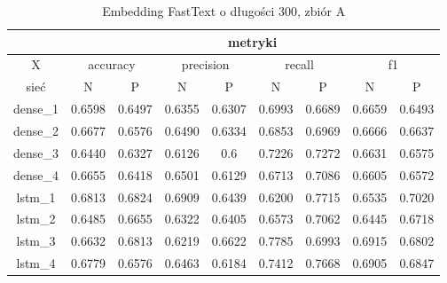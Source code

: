 \begin{table}[p] \label{tab:wyniki_fastext_A} \centering
    \caption{Embedding FastText o długości 300, zbiór A}
    \begin{tabular}{|c|c|c|c|c|c|c|c|c|}    \hline

                 & \multicolumn{8}{c|}{metryki}                                                                                                                               \\ \hline
        X        & \multicolumn{2}{c|}{accuracy} & \multicolumn{2}{c|}{precision} & \multicolumn{2}{c|}{recall} & \multicolumn{2}{c|}{f1}                                     \\ \hline
        sieć     & N                             & P                              & N                           & P                       & N      & P      & N      & P      \\ \hline
        dense\_1 & 0.6598                        & 0.6497                         & 0.6355                      & 0.6307                  & 0.6993 & 0.6689 & 0.6659 & 0.6493 \\ \hline
        dense\_2 & 0.6677                        & 0.6576                         & 0.6490                      & 0.6334                  & 0.6853 & 0.6969 & 0.6666 & 0.6637 \\ \hline
        dense\_3 & 0.6440                        & 0.6327                         & 0.6126                      & 0.6                     & 0.7226 & 0.7272 & 0.6631 & 0.6575 \\ \hline
        dense\_4 & 0.6655                        & 0.6418                         & 0.6501                      & 0.6129                  & 0.6713 & 0.7086 & 0.6605 & 0.6572 \\ \hline
        lstm\_1  & 0.6813                        & 0.6824                         & 0.6909                      & 0.6439                  & 0.6200 & 0.7715 & 0.6535 & 0.7020 \\ \hline
        lstm\_2  & 0.6485                        & 0.6655                         & 0.6322                      & 0.6405                  & 0.6573 & 0.7062 & 0.6445 & 0.6718 \\ \hline
        lstm\_3  & 0.6632                        & 0.6813                         & 0.6219                      & 0.6622                  & 0.7785 & 0.6993 & 0.6915 & 0.6802 \\ \hline
        lstm\_4  & 0.6779                        & 0.6576                         & 0.6463                      & 0.6184                  & 0.7412 & 0.7668 & 0.6905 & 0.6847 \\ \hline

\end{tabular}
\end{table}
